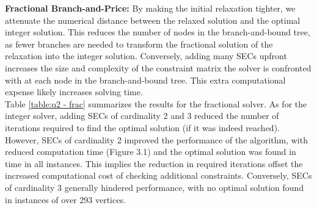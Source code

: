 \documentclass[12pt]{article}
\numberwithin{equation}{section}
\begin{document}
\vspace{1em} 

\noindent\textbf{Fractional Branch-and-Price:} By making the initial relaxation tighter, we attenuate the numerical distance between the relaxed solution and the optimal integer solution. This reduces the number of nodes in the branch-and-bound tree, as fewer branches are needed to transform the fractional solution of the relaxation into the integer solution. Conversely, adding many SECs upfront increases the size and complexity of the constraint matrix the solver is confronted with at each node in the branch-and-bound tree. This extra computational expense likely increases solving time. \\

\noindent Table \ref{table:q2 - frac} summarizes the results for the fractional solver. As for the integer solver, adding SECs of cardinality 2 and 3 reduced the number of iterations required to find the optimal solution (if it was indeed reached). However, SECs of cardinality 2 improved the performance of the algorithm, with reduced computation time (Figure 3.1) and the optimal solution was found in time in all instances. This implies the reduction in required iterations offset the increased computational cost of checking additional constraints. Conversely, SECs of cardinality 3 generally hindered performance, with no optimal solution found in instances of over 293 vertices.
\end{document}
